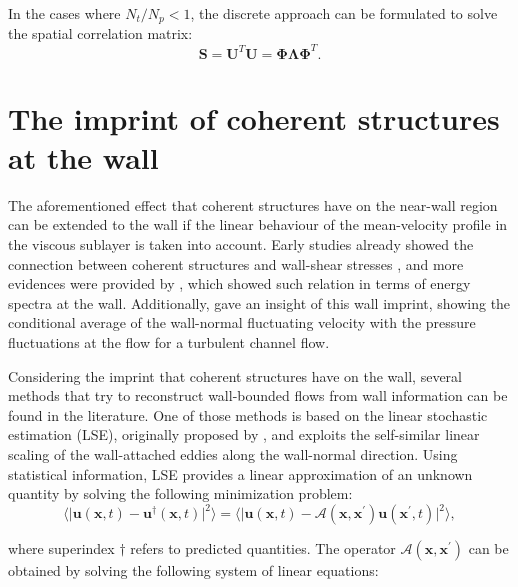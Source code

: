 In the cases where $N_t/N_p<1$, the discrete approach can be formulated to solve the spatial correlation matrix:
\begin{equation}
    \mathbf{S}=\mathbf{U}^T\mathbf{U}=\boldsymbol{\Phi}\boldsymbol{\Lambda}\boldsymbol{\Phi}^T.
    \label{ch03:eq12}
\end{equation}

\section{The imprint of coherent structures at the wall}\label{ch02:s4}

The aforementioned effect that coherent structures have on the near-wall region can be extended to the wall if the linear behaviour of the mean-velocity profile in the viscous sublayer is taken into account.
Early studies already showed the connection between coherent structures and wall-shear stresses \citep{brown1977large}, and more evidences were provided by \citet{orlu2011fluctuating}, which showed such relation in terms of energy spectra at the wall.
Additionally, \citet{sanmiguel2018wall} gave an insight of this wall imprint, showing the conditional average of the wall-normal fluctuating velocity with the pressure fluctuations at the flow for a turbulent channel flow.

Considering the imprint that coherent structures have on the wall, several methods that try to reconstruct wall-bounded flows from wall information can be found in the literature.
One of those methods is based on the linear stochastic estimation (LSE), originally proposed by \citet{adrian1979conditional}, and exploits the self-similar linear scaling of the wall-attached eddies along the wall-normal direction.
Using statistical information, LSE provides a linear approximation of an unknown quantity by solving the following minimization problem:
\begin{equation}
  \bigl\langle \bigl|\boldsymbol{u}(\boldsymbol{x}, t) - \boldsymbol{u}^{\dagger}(\boldsymbol{x}, t)\bigl|^2\bigl\rangle = \bigl\langle \bigl|\boldsymbol{u}(\boldsymbol{x}, t) - \mathcal{A}(\boldsymbol{x},\boldsymbol{x^{\prime}}) \boldsymbol{u}(\boldsymbol{x^{\prime}}, t)\bigl|^2\bigl\rangle,
  \label{ch02:eq11}
\end{equation}

\noindent where superindex $\dagger$ refers to predicted quantities. The operator $ \mathcal{A}(\boldsymbol{x},\boldsymbol{x^{\prime}})$ can be obtained by solving the following system of linear equations:

